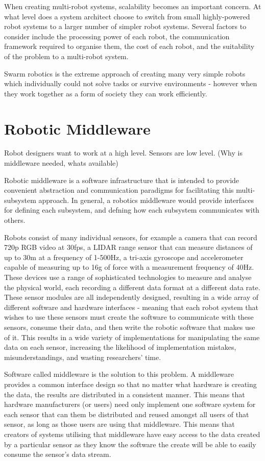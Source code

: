 \documentclass{l4proj}
\begin{document}
When creating multi-robot systems, scalability becomes an important concern. At what level does a system architect choose to switch from small highly-powered robot systems to a larger number of simpler robot systems. Several factors to consider include the processing power of each robot, the communication framework required to organise them, the cost of each robot, and the suitability of the problem to a multi-robot system.

Swarm robotics is the extreme approach of creating many very simple robots which individually could not solve tasks or survive environments - however when they work together as a form of society they can work efficiently.

\section{Robotic Middleware}

Robot designers want to work at a high level. Sensors are low level. (Why is middleware needed, whats available)

Robotic middleware is a software infrastructure that is intended to provide convenient abstraction and communication paradigms for facilitating this multi-subsystem approach. In general, a robotics middleware would provide interfaces for defining each subsystem, and defning how each subsystem communicates with others.

Robots consist of many individual sensors, for example a camera that can record 720p RGB video at 30fps, a LIDAR range sensor that can measure distances of up to 30m at a frequency of 1-500Hz, a tri-axis gyroscope and accelerometer capable of measuring up to 16g of force with a measurement frequency of 40Hz. These devices use a range of sophisticated technologies to measure and analyse the physical world, each recording a different data format at a different data rate. These sensor modules are all independently designed, resulting in a wide array of different software and hardware interfaces - meaning that each robot system that wishes to use these sensors must create the software to communicate with these sensors, consume their data, and then write the robotic software that makes use of it. This results in a wide variety of implementations for manipulating the same data on each sensor, increasing the likelihood of implementation mistakes, misunderstandings, and wasting researchers' time.

Software called middleware is the solution to this problem. A middleware provides a common interface design so that no matter what hardware is creating the data, the results are distributed in a consistent manner. This means that hardware manufacturers (or users) need only implement one software system for each sensor that can them be distributed and reused amongst all users of that sensor, as long as those users are using that middleware. This means that creators of systems utilising that middleware have easy access to the data created by a particular sensor as they know the software the create will be able to easily consume the sensor's data stream.
\end{document}
